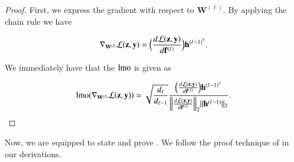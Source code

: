 \begin{proof}

First, we express the gradient with respect to $\mathbf{W}^{(\ell)}$. By applying the chain rule we have

\[
\nabla_{\mathbf{W}^{(\ell)}} \mathcal{L}(\mathbf{z},\mathbf{y})  = \Bigl( \frac{d \mathcal{L}(\mathbf{z},\mathbf{y}) }{d \mathbf{f}^{(\ell)}} \Bigr) \mathbf{h}^{(\ell-1)^\mathsf{T}}.
\]

We immediately have that the $\operatorname{lmo}$ is given as

\begin{equation*}
    \operatorname{lmo}(\nabla_{\mathbf{W}^{(\ell)}} \mathcal{L}(\mathbf{z},\mathbf{y}) ) = \sqrt{\frac{d_{\ell}}{d_{\ell-1}}} \frac{\Bigl(\frac{d \mathcal{L}(\mathbf{z},\mathbf{y}) }{d \mathbf{f}^{(\ell)}} \Bigr) \mathbf{h}^{(\ell-1)^\top}}{\Bigl\|\frac{d \mathcal{L}(\mathbf{z},\mathbf{y}) }{d \mathbf{f}^{(\ell)}}\Bigr\|_2 \|\mathbf{h}^{(\ell-1)}\|_2}.
\end{equation*}

\end{proof}


Now, we are equipped to state and prove . We follow the proof technique of \citet{yang2023spectral} in our derivations.

